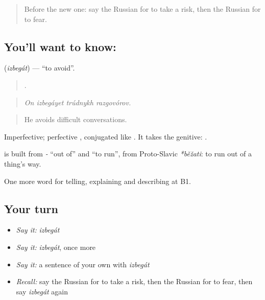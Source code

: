 \label{lesson:RU-C373-izbegat}



\begin{quote}
Before the new one: say the Russian for to take a risk, then the Russian for to fear.
\end{quote}

\subsection*{You'll want to know: }
\textbf{} (\emph{izbegát}) — \textquotedblleft{}to avoid\textquotedblright{}.

\begin{quote}
   .
\end{quote}

\begin{quote}
\emph{On izbegáyet trúdnykh razgovórov.}
\end{quote}

\begin{quote}
He avoids difficult conversations.
\end{quote}

Imperfective; perfective \emph{}, conjugated like \emph{}. It takes the genitive: \emph{ }.

\begin{cousinweb}
\textbf{} is built from \emph{-} \textquotedblleft{}out of\textquotedblright{} and \emph{} \textquotedblleft{}to run\textquotedblright{}, from Proto-Slavic \emph{*běžati}: to run out of a thing’s way.
\end{cousinweb}

\begin{grammarlens}[title={What you've built}]
One more word for telling, explaining and describing at B1.
\end{grammarlens}

\subsection*{Your turn}
\begin{itemize}
\raggedright
  \item \emph{Say it:} \emph{izbegát}
  \item \emph{Say it:} \emph{izbegát}, once more
  \item \emph{Say it:} a sentence of your own with \emph{izbegát}
  \item \emph{Recall:} say the Russian for to take a risk, then the Russian for to fear, then say \emph{izbegát} again
\end{itemize}

